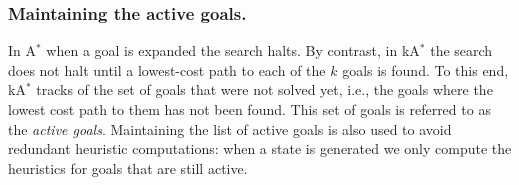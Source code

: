 \documentclass{aicom2e}
\newcommand{\astar}{A$^*$}
\newcommand{\kastar}{kA$^*$}
\newcommand{\open}{\textsc{Open}}
\begin{document}

\subsubsection*{Maintaining the active goals.}

In \astar{} when a goal is expanded the search halts. By contrast, in \kastar{}
the search does not halt until a lowest-cost path to each of the $k$ goals is
found. To this end, \kastar{} tracks of the set of goals that were not solved
yet, i.e., the goals where the lowest cost path to them has not been found.
This set of goals is referred to as the {\em active goals}. Maintaining the
list of active goals is also used to avoid redundant heuristic computations:
when a state is generated we only compute the heuristics for goals that are
still active.



\end{document}
